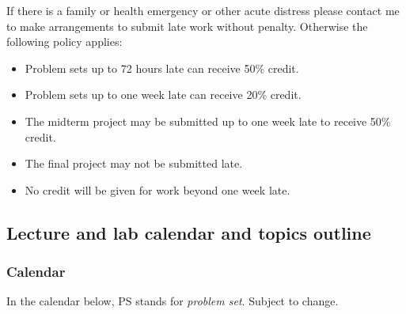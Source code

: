 \documentclass[letterpaper]{article}
\providecommand{\tightlist}{%
  \setlength{\itemsep}{0pt}\setlength{\parskip}{0pt}}
\begin{document}
If there is a family or health emergency or other acute distress please
contact me to make arrangements to submit late work without penalty.
Otherwise the following policy applies:

\begin{itemize}
\tightlist
\item
  Problem sets up to 72 hours late can receive 50\% credit.
\item
  Problem sets up to one week late can receive 20\% credit.
\item
  The midterm project may be submitted up to one week late to receive
  50\% credit.
\item
  The final project may not be submitted late.
\item
  No credit will be given for work beyond one week late.
\end{itemize}

\subsection{Lecture and lab calendar and topics
outline}\label{lecture-and-lab-calendar-and-topics-outline}

\subsubsection{Calendar}\label{calendar}

In the calendar below, PS stands for \emph{problem set}. Subject to
change.
\end{document}
